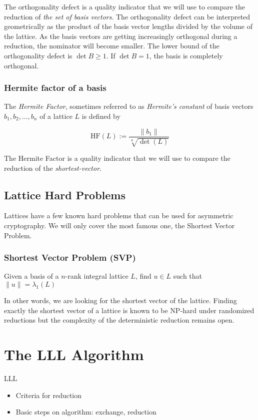 \documentclass[10pt]{article}
\begin{document}
The orthogonality defect is a quality indicator that we will use to compare the reduction of \emph{the set of basis vectors}. The orthogonality defect can be interpreted geometrically as the product of the basis vector lengths divided by the volume of the lattice. As the basis vectors are getting increasingly orthogonal during a reduction, the nominator will become smaller. The lower bound of the orthogonality defect is $\det B \ge 1$. If $\det B = 1$, the basis is completely orthogonal.

\subsubsection{Hermite factor of a basis}
The \emph{Hermite Factor}, sometimes referred to as \emph{Hermite's constant} of basis vectors $b_1, b_2,...,b_n$ of a lattice $L$ is defined by

\[
    \text{HF}(L) := \frac{\|b_1\|}{\sqrt[n]{\det(L)}}
\]

The Hermite Factor is a quality indicator that we will use to compare the reduction of the \emph{shortest-vector}.

\subsection{Lattice Hard Problems}

Lattices have a few known hard problems that can be used for asymmetric cryptography. We will only cover the most famous one, the Shortest Vector Problem.

\subsubsection{Shortest Vector Problem (SVP)}

Given a basis of a $n$-rank integral lattice $L$, find $u \in L$ such that $\|u\| = \lambda_1 (L)$

In other words, we are looking for the shortest vector of the lattice. Finding exactly the shortest vector of a lattice is known to be NP-hard under randomized reductions\cite{Ajtai:1998:SVP} but the complexity of the deterministic reduction remains open.

\section{The LLL Algorithm}

LLL 

\begin{itemize}
\item Criteria for reduction
\item Basic steps on algorithm: exchange, reduction
\end{itemize}
\end{document}
